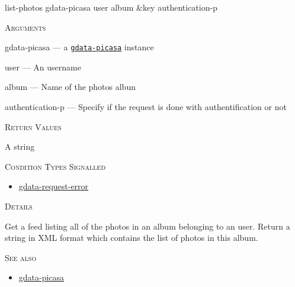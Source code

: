 \documentclass[a4paper]{report}
\begin{document}
    \label{cl-gdata-picasa__fun__list-photos}
    \begin{defun}[Function]
    list-photos gdata-picasa user album &key authentication-p


    
    \bigskip
    \textsc{Arguments}

gdata-picasa
	--- a \hyperref[cl-gdata-picasa__class__gdata-picasa]{\texttt{gdata-picasa}}
   instance

user
	--- An username

album
	--- Name of the photos albun

authentication-p
	--- Specify if the request is done with authentification or not




    
    \bigskip
    \textsc{Return Values}

A string


      
    \bigskip
    \textsc{Condition Types Signalled}


 	
    \begin{itemize}
    
	  
    \item
    \hyperref[cl-gdata-service__class__gdata-request-error]{gdata-request-error}
    
	
    \end{itemize}
  
      


	
    \bigskip
    \textsc{Details}

Get a feed listing all of the photos in an album belonging
to an user.
Return a string in XML format which contains the list of photos in this album.


      
    \bigskip
    \textsc{See also}


	
    \begin{itemize}
    
	  
    \item
    \hyperref[cl-gdata-picasa__class__gdata-picasa]{gdata-picasa}
    
	
    \end{itemize}
  
      


    
    \end{defun}
  
\end{document}
